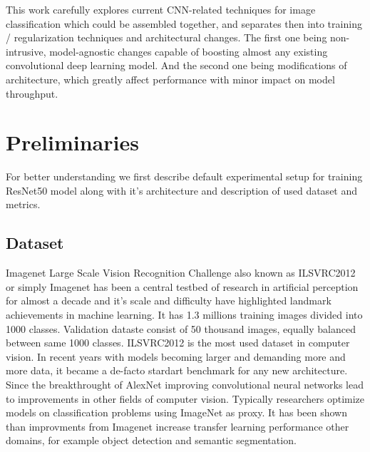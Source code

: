 
This work carefully explores current CNN-related techniques for image classification which could be assembled together, and separates then into training / regularization techniques and architectural changes. The first one being non-intrusive, model-agnostic changes capable of boosting almost any existing convolutional deep learning model. And the second one being modifications of architecture, which greatly affect performance with minor impact on model throughput. 



\section{Preliminaries}
For better understanding we first describe default experimental setup for training ResNet50 model along with it's architecture and description of used dataset and metrics. 

\subsection{Dataset} \label{subsec: imagenet}


Imagenet Large Scale Vision Recognition Challenge also known as ILSVRC2012 or simply Imagenet has been a central testbed of research in artificial perception for almost a decade and it's scale and difficulty have highlighted landmark achievements in machine learning. It has 1.3 millions training images divided into 1000 classes. Validation dataste consist of 50 thousand images, equally balanced between same 1000 classes. ILSVRC2012 is the most used dataset in computer vision. %
In recent years with models becoming larger and demanding more and more data, it became a de-facto stardart benchmark for any new architecture. Since the breakthrought of AlexNet improving convolutional neural networks lead to improvements in other fields of computer vision. Typically researchers optimize models on classification problems using ImageNet \cite{deng2009_imagenet} as proxy. It has been shown \cite{he2019bag_of_tricks} \cite{kornblith2019_better} than improvments from Imagenet increase transfer learning performance other domains, for example object detection and semantic segmentation.


